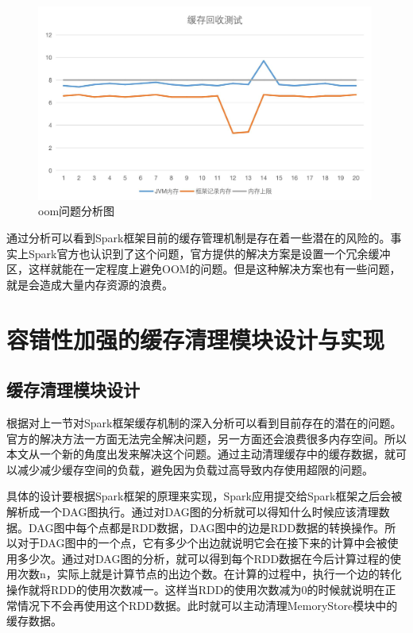 \begin{figure}[htbp]
    \centering
    \includegraphics[width=0.99\textwidth]{Img/oom.png}
    \caption{oom问题分析图}
    \label{fig:oom}
\end{figure}


通过分析可以看到Spark框架目前的缓存管理机制是存在着一些潜在的风险的。事实上Spark官方也认识到了这个问题，官方提供的解决方案是设置一个冗余缓冲区，这样就能在一定程度上避免OOM的问题。但是这种解决方案也有一些问题，就是会造成大量内存资源的浪费。

\section{容错性加强的缓存清理模块设计与实现}

\subsection{缓存清理模块设计}

根据对上一节对Spark框架缓存机制的深入分析可以看到目前存在的潜在的问题。官方的解决方法一方面无法完全解决问题，另一方面还会浪费很多内存空间。所以本文从一个新的角度出发来解决这个问题。通过主动清理缓存中的缓存数据，就可以减少减少缓存空间的负载，避免因为负载过高导致内存使用超限的问题。

具体的设计要根据Spark框架的原理来实现，Spark应用提交给Spark框架之后会被解析成一个DAG图执行。通过对DAG图的分析就可以得知什么时候应该清理数据。DAG图中每个点都是RDD数据，DAG图中的边是RDD数据的转换操作。所以对于DAG图中的一个点，它有多少个出边就说明它会在接下来的计算中会被使用多少次。通过对DAG图的分析，就可以得到每个RDD数据在今后计算过程的使用次数n，实际上就是计算节点的出边个数。在计算的过程中，执行一个边的转化操作就将RDD的使用次数减一。这样当RDD的使用次数减为0的时候就说明在正常情况下不会再使用这个RDD数据。此时就可以主动清理MemoryStore模块中的缓存数据。

